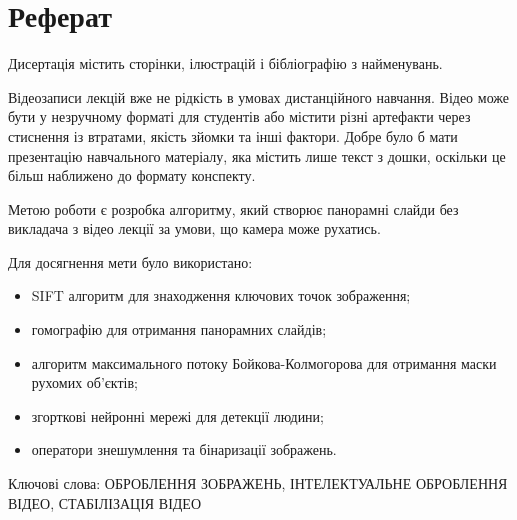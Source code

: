 \chapter*{Реферат}

Дисертація містить
\pageref{LastPage}
сторінки,
ілюстрацій
і бібліографію з
найменувань.

Відеозаписи лекцій вже не рідкість в умовах дистанційного навчання.
Відео може бути у незручному форматі для студентів або містити різні артефакти
через стиснення із втратами, якість зйомки та  інші фактори. Добре було б мати
презентацію навчального матеріалу, яка містить лише текст з дошки,
оскільки це більш наближено до формату конспекту.

Метою роботи є розробка алгоритму,
який створює панорамні слайди без викладача з відео лекції
за умови, що камера може рухатись.

Для досягнення мети було використано:
\begin{itemize}
      \item SIFT алгоритм для знаходження ключових точок зображення;
      \item гомографію для отримання панорамних слайдів;
      \item алгоритм максимального потоку Бойкова-Колмогорова
            для отримання маски рухомих об'єктів;
      \item згорткові нейронні мережі для детекції людини;
      \item оператори знешумлення та бінаризації зображень.
\end{itemize}

Ключові слова:
\MakeUppercase{оброблення зображень, інтелектуальне оброблення відео,
      стабілізація відео}
